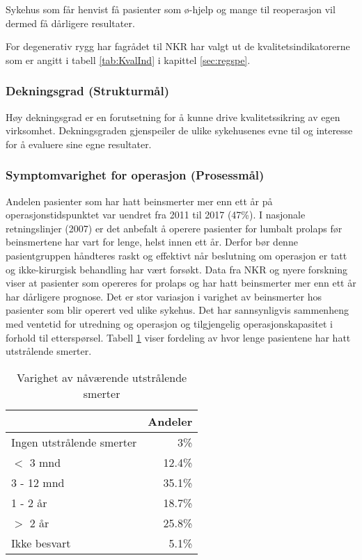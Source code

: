 Sykehus som får henvist få pasienter som ø-hjelp og
mange til reoperasjon vil dermed få dårligere resultater. 

 



For degenerativ rygg har fagrådet til NKR har valgt ut de kvalitetsindikatorerne som er angitt i tabell \ref{tab:KvalInd}
i kapittel \ref{sec:regspe}. 

\subsubsection{Dekningsgrad (Strukturmål)}
Høy dekningsgrad er en forutsetning for å kunne drive kvalitetssikring av egen virksomhet. Dekningsgraden gjenspeiler de ulike sykehusenes evne til og interesse for å evaluere sine egne resultater.

\clearpage

\subsubsection{Symptomvarighet for operasjon (Prosessmål)} 

Andelen pasienter som har hatt beinsmerter mer enn ett år på
operasjonstidspunktet var uendret fra 2011 til 2017 (47\%). 
I nasjonale retningslinjer (2007) er det anbefalt å operere pasienter for lumbalt prolaps før
beinsmertene har vart for lenge, helst innen ett år. Derfor bør denne
pasientgruppen håndteres raskt og effektivt når beslutning om operasjon er tatt og
ikke-kirurgisk behandling har vært forsøkt. Data fra NKR og nyere forskning viser at
pasienter som opereres for prolaps og har hatt beinsmerter mer enn ett år har
dårligere prognose. 
Det er stor variasjon i varighet av beinsmerter hos pasienter som blir
operert ved ulike sykehus. Det har sannsynligvis sammenheng med ventetid for
utredning og operasjon og tilgjengelig operasjonskapasitet i forhold til etterspørsel.
Tabell  \ref{tab:Utstr} viser fordeling av hvor lenge pasientene har hatt utstrålende smerter. 



\begin{table}[ht]
\centering
\begin{tabular}{lr}
  \hline
 & Andeler \\ 
  \hline
Ingen utstrålende smerter & 3\% \\ 
  $<$ 3 mnd & 12.4\% \\ 
  3 - 12 mnd & 35.1\% \\ 
  1 - 2 år & 18.7\% \\ 
  $>$ 2 år & 25.8\% \\ 
  Ikke besvart & 5.1\% \\ 
   \hline
\end{tabular}
\caption{Varighet av nåværende utstrålende smerter} 
\label{tab:Utstr}
\end{table}

